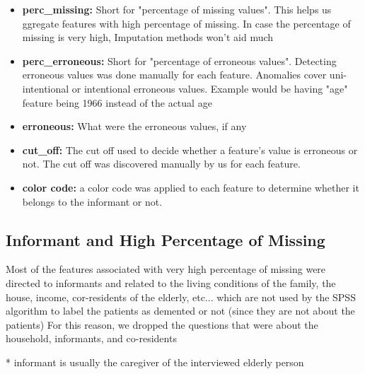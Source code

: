 \documentclass{article}
\begin{document}
\begin{itemize}
\item \textbf{perc\_missing:} Short for "percentage of missing values". This helps us ggregate features with high percentage of missing. In case the percentage of missing is very high, Imputation methods won't aid much

\item \textbf{perc\_erroneous:} Short for "percentage of erroneous values". Detecting erroneous values was done manually for each feature. Anomalies cover uni-intentional or intentional erroneous values. Example would be having "age" feature being 1966 instead of the actual age

\item \textbf{erroneous:} What were the erroneous values, if any

\item \textbf{cut\_off:} The cut off used to decide whether a feature's value is erroneous or not. The cut off was discovered manually by us for each feature.

\item \textbf{color code:} a color code was applied to each feature to determine whether it belongs to the informant or not.
\end{itemize} 

\subsection{Informant and High Percentage of Missing}
Most of the features associated with very high percentage of missing were directed to informants and related to the living conditions of the family, the house, income, cor-residents of the elderly, etc... which are not used by the SPSS algorithm to label the patients as demented or not (since they are not about the patients) For this reason, we dropped the questions that were about the household, informants, and co-residents

* informant is usually the caregiver of the interviewed elderly person
\end{document}
